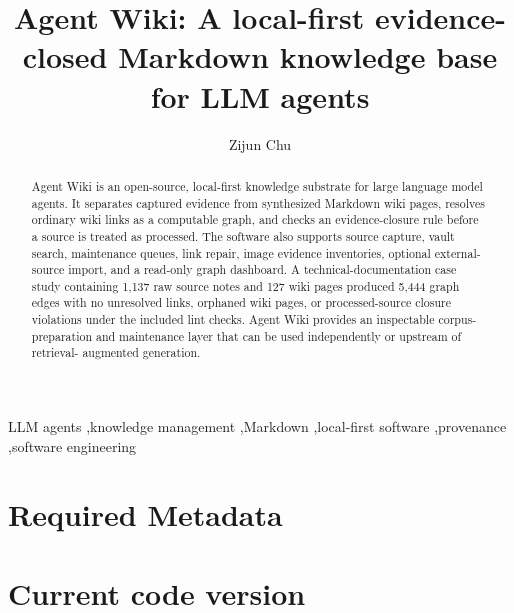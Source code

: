\documentclass[preprint,12pt,a4paper]{elsarticle}
\begin{document}
\begin{frontmatter}

\title{Agent Wiki: A local-first evidence-closed Markdown knowledge base for LLM agents}

\author[independent]{Zijun Chu}
\address[independent]{Independent Researcher, Room 1303, No. 19, Lane 899,
Xinfeng Middle Road, Qingpu District, Shanghai, China}

\begin{abstract}
Agent Wiki is an open-source, local-first knowledge substrate for large language
model agents. It separates captured evidence from synthesized Markdown wiki
pages, resolves ordinary wiki links as a computable graph, and checks an
evidence-closure rule before a source is treated as processed. The software also
supports source capture, vault search, maintenance queues, link repair, image
evidence inventories, optional external-source import, and a read-only graph
dashboard. A technical-documentation case study containing 1,137 raw source
notes and 127 wiki pages produced 5,444 graph edges with no unresolved links,
orphaned wiki pages, or processed-source closure violations under the included
lint checks. Agent Wiki provides an inspectable corpus-preparation and
maintenance layer that can be used independently or upstream of retrieval-
augmented generation.
\end{abstract}

\begin{keyword}
LLM agents \sep knowledge management \sep Markdown \sep local-first software
\sep provenance \sep software engineering
\end{keyword}

\end{frontmatter}

\section*{Required Metadata}

\section*{Current code version}
\end{document}
